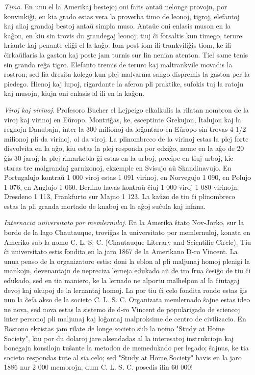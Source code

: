 \emph{Timo}. En unu el la Amerikaj bestejoj oni faris anta\u u
nelonge provojn, por konvinki\^gi, en kia grado estas vera la
proverba timo de leonoj, tigroj, elefantoj kaj aliaj grandaj bestoj
anta\u u simpla muso. Anta\u ue oni enlasis muson en la ka\^gon, en
kiu sin trovis du grandegaj leonoj; tiuj \^ci forsaltis kun timego,
terure kriante kaj penante eli\^gi el la ka\^go. Iom post iom ili
trankvili\^gis tiom, ke ili \^cirka\u uflaris la gaston kaj poste
jam turnis sur lin nenian atenton. Tiel same tenis sin granda re\^ga
tigro. Elefanto tremis de teruro kaj maltrankvile movadis la
rostron; sed lia dresita kolego kun plej malvarma sango dispremis la
gaston per la piedego. Hienoj kaj lupoj, rigardante la aferon pli
praktike, sufokis tuj la ratojn kaj musojn, kiujn oni enlasis al ili
en la ka\^gon.

\emph{Viroj kaj virinoj}. Profesoro Bucher el Lejpcigo elkalkulis la
rilatan nombron de la viroj kaj virinoj en E\u uropo. Montri\^gas,
ke, esceptinte Grekujon, Italujon kaj la regnojn Danubajn, inter la
300 milionoj da lo\^gantaro en E\u uropo sin trovas 4 1/2 milionoj
pli da virinoj, ol da viroj. La plinombreco de la virinoj estas la
plej forte disvolvita en la a\^go, kiu estas la plej responda por
edzi\^go, nome en la a\^go de 20 \^gis 30 jaroj; la plej rimarkebla
\^gi estas en la urboj, precipe en tiuj urboj, kie staras tre
malgrandaj garnizonoj, ekzemple en Svisujo a\u u Skandinavujo. En
Portugalujo kontra\u u 1 000 viroj estas 1 091 virinoj, en Norvegujo
1 090, en Polujo 1 076, en Anglujo 1 060. Berlino havas kontra\u u
\^ciuj 1 000 viroj 1 080 virinojn, Dresdeno 1 113, Frankfurto sur
Majno 1 123. La ka\u uzo de tiu \^ci plinombreco estas la pli granda
mortado de knaboj en la a\^goj su\^cula kaj infana.

\emph{Internacia universitato por memlernuloj}. En la Amerika
\^stato Nov-Jorko, sur la bordo de la lago Chautauque, trovi\^gas la
universitato por memlernuloj, konata en Ameriko sub la nomo C. L. S.
C. (Chautauque Literary and Scientific Circle). Tiu \^ci
universitato estis fondita en la jaro 1867 de la Amerikano D-ro
Vincent. La unua penso de la organizatoro estis: doni la eblon al
pli maljunaj homoj plenigi la mankojn, devenantajn de nepreciza
lerneja edukado a\u u de tro frua \^cesi\^go de tiu \^ci edukado,
sed en tia maniero, ke la lernado ne alportu malhelpon al la
\^ciutagaj devoj kaj okupoj de la lernantaj homoj. La por tiu \^ci
celo fondita rondo estas \^gis nun la \^cefa akso de la societo C.
L. S. C. Organizata memlernado \^sajne estas ideo ne nova, sed nova
estas la sistemo de d-ro Vincent de popularigado de sciencoj inter
personoj pli maljunaj kaj lo\^gantaj malproksime de centro de
civilizacio. En Bostono ekzistas jam rilate de longe societo sub la
nomo "Study at Home Society", kiu por du dolaroj jare alsendadas
al la interesatoj instrukciojn kaj bonegajn konsilojn tu\^sante la
metodon de memedukado per legado; \^sajnus, ke tia societo respondas
tute al sia celo; sed "Study at Home Society" havis en la jaro
1886 nur 2 000 membrojn, dum C. L. S. C. posedis ilin 60 000!


